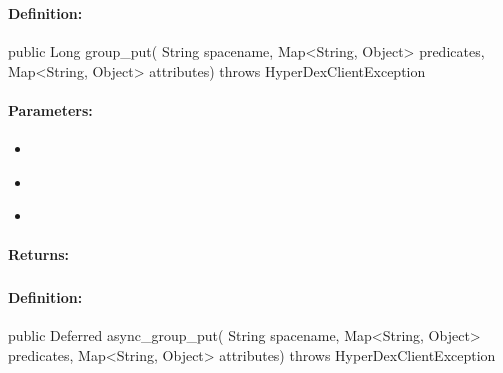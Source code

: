 \pagebreak
\subsubsection{}
\label{api:java:group_put}


\paragraph{Definition:}
\begin{javacode}
public Long group_put(
        String spacename,
        Map<String, Object> predicates,
        Map<String, Object> attributes) throws HyperDexClientException
\end{javacode}

\paragraph{Parameters:}
\begin{itemize}[noitemsep]
\item {}\\

\item {}\\

\item {}\\

\end{itemize}

\paragraph{Returns:}


\pagebreak
\subsubsection{}
\label{api:java:async_group_put}


\paragraph{Definition:}
\begin{javacode}
public Deferred async_group_put(
        String spacename,
        Map<String, Object> predicates,
        Map<String, Object> attributes) throws HyperDexClientException
\end{javacode}

